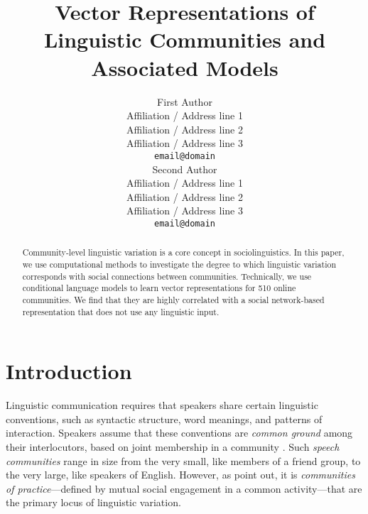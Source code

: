 \documentclass[11pt]{article}
\title{Vector Representations of Linguistic Communities and Associated Models}
\author{First Author \\
  Affiliation / Address line 1 \\
  Affiliation / Address line 2 \\
  Affiliation / Address line 3 \\
  \texttt{email@domain} \\\And
  Second Author \\
  Affiliation / Address line 1 \\
  Affiliation / Address line 2 \\
  Affiliation / Address line 3 \\
  \texttt{email@domain} \\}
\date{}
\begin{document}
\maketitle
\begin{abstract}
  Community-level linguistic variation is a core concept in sociolinguistics.
  In this paper, we use computational methods to investigate the degree to which  
  linguistic variation corresponds with social connections between communities.
  Technically, we use conditional language models to learn vector representations
  for 510 online communities.
  We find that they are highly correlated with a social network-based 
  representation that does not use any linguistic input.
\end{abstract}








\section{Introduction}

Linguistic communication requires that speakers share
certain linguistic conventions, such as syntactic
structure, word meanings, and patterns of interaction.
Speakers assume that these conventions are \emph{common ground} among
their interlocutors, based on joint membership in a community
\cite{Stalnaker2002, Clark1996}.  Such \emph{speech communities} \citep{Gumperz1972} 
range in size from the very small, like members of a friend group, 
to the very large, like speakers of English. However, as \citet{Eckert1992}
point out, it is \emph{communities of practice}---defined by mutual social engagement
in a common activity---that are the primary locus of linguistic variation.
\end{document}
